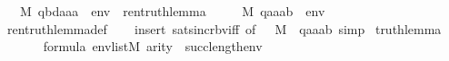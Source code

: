 \begin{isabellebody}
\ \ \ {\isacharparenleft}{\kern0pt}M{\isacharcomma}{\kern0pt}\ {\isacharbrackleft}{\kern0pt}q{\isacharcomma}{\kern0pt}b{\isacharcomma}{\kern0pt}d{\isacharcomma}{\kern0pt}a{}{\isacharcomma}{\kern0pt}a{}{\isacharcomma}{\kern0pt}a{}{\isacharbrackright}{\kern0pt}\ {\isacharat}{\kern0pt}\ env\ {\isasymTurnstile}\ ren{\isacharunderscore}{\kern0pt}truth{\isacharunderscore}{\kern0pt}lemma{\isacharparenleft}{\kern0pt}{\isasymphi}{\isacharparenright}{\kern0pt}\ {\isacharparenright}{\kern0pt}\ {\isasymlongleftrightarrow}\isanewline
\ \ \ {\isacharparenleft}{\kern0pt}M{\isacharcomma}{\kern0pt}\ {\isacharbrackleft}{\kern0pt}q{\isacharcomma}{\kern0pt}a{}{\isacharcomma}{\kern0pt}a{}{\isacharcomma}{\kern0pt}a{}{\isacharcomma}{\kern0pt}b{\isacharbrackright}{\kern0pt}\ {\isacharat}{\kern0pt}\ env\ {\isasymTurnstile}\ {\isasymphi}{\isacharparenright}{\kern0pt}{\isachardoublequoteclose}\isanewline
%
\isadelimproof
\ \ %
\endisadelimproof
%
\isatagproof
{}\isamarkupfalse%
\ ren{\isacharunderscore}{\kern0pt}truth{\isacharunderscore}{\kern0pt}lemma{\isacharunderscore}{\kern0pt}def\isanewline
\ \ \isamarkupfalse%
\ {\isacharparenleft}{\kern0pt}insert\ sats{\isacharunderscore}{\kern0pt}incr{\isacharunderscore}{\kern0pt}bv{\isacharunderscore}{\kern0pt}iff\ {\isacharbrackleft}{\kern0pt}of\ {\isacharunderscore}{\kern0pt}\ {\isacharunderscore}{\kern0pt}\ M\ {\isacharunderscore}{\kern0pt}\ {\isachardoublequoteopen}{\isacharbrackleft}{\kern0pt}q{\isacharcomma}{\kern0pt}a{}{\isacharcomma}{\kern0pt}a{}{\isacharcomma}{\kern0pt}a{}{\isacharcomma}{\kern0pt}b{\isacharbrackright}{\kern0pt}{\isachardoublequoteclose}{\isacharbrackright}{\kern0pt}{\isacharcomma}{\kern0pt}\ simp{\isacharparenright}{\kern0pt}%
\endisatagproof
{\isafoldproof}%
%
\isadelimproof
\isanewline
%
\endisadelimproof
\isanewline
{}\isamarkupfalse%
\ truth{\isacharunderscore}{\kern0pt}lemma{\isacharprime}{\kern0pt}\ {\isacharcolon}{\kern0pt}\isanewline
\ \ \isanewline
\ \ \ \ {\isachardoublequoteopen}{\isasymphi}{\isasymin}formula{\isachardoublequoteclose}\ {\isachardoublequoteopen}env{\isasymin}list{\isacharparenleft}{\kern0pt}M{\isacharparenright}{\kern0pt}{\isachardoublequoteclose}\ {\isachardoublequoteopen}arity{\isacharparenleft}{\kern0pt}{\isasymphi}{\isacharparenright}{\kern0pt}\ {\isasymle}\ succ{\isacharparenleft}{\kern0pt}length{\isacharparenleft}{\kern0pt}env{\isacharparenright}{\kern0pt}{\isacharparenright}{\kern0pt}{\isachardoublequoteclose}\ \isanewline

\end{isabellebody}
